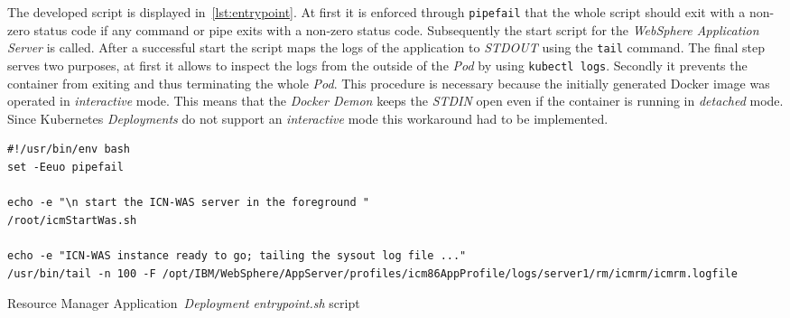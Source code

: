 \begin{itemize}
{\begin{itemize}
{        The developed script is displayed in~\cref{lst:entrypoint}.
        At first it is enforced through \texttt{pipefail} that the whole script should exit with a non-zero status code if any command or pipe exits with a non-zero status code.
        Subsequently the start script for the \textit{WebSphere Application Server} is called.
        After a successful start the script maps the logs of the application to \textit{STDOUT} using the \texttt{tail} command.
        The final step serves two purposes, at first it allows to inspect the logs from the outside of the \textit{Pod} by using \texttt{kubectl logs}.
        Secondly it prevents the container from exiting and thus terminating the whole \textit{Pod}.
        This procedure is necessary because the initially generated Docker image was operated in \textit{interactive} mode.
        This means that the \textit{Docker Demon} keeps the \textit{STDIN} open even if the container is running in \textit{detached} mode.
        Since Kubernetes \textit{Deployments} do not support an \textit{interactive} mode this workaround had to be implemented.
\begin{Listing}[h]
\begin{lstlisting}
#!/usr/bin/env bash
set -Eeuo pipefail

echo -e "\n start the ICN-WAS server in the foreground "
/root/icmStartWas.sh

echo -e "ICN-WAS instance ready to go; tailing the sysout log file ..."
/usr/bin/tail -n 100 -F /opt/IBM/WebSphere/AppServer/profiles/icm86AppProfile/logs/server1/rm/icmrm/icmrm.logfile
\end{lstlisting}
\caption{Resource Manager Application~\textit{Deployment} \textit{entrypoint.sh} script}
\label{lst:entrypoint}
\end{Listing}
        }
    \end{itemize}
    }
\end{itemize}

